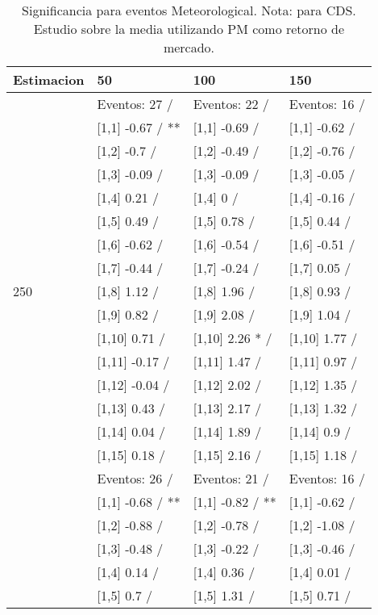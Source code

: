 \begin{table}

\caption{Significancia para eventos Meteorological. Nota: para CDS. Estudio sobre la media utilizando PM como retorno de mercado.}
\centering
\begin{tabular}[t]{llll}
\toprule
Estimacion & 50 & 100 & 150\\
\midrule
 & Eventos:  27 / & Eventos:  22 / & Eventos:  16 /\\
 & {}[1,1] -0.67  / ** & {}[1,1] -0.69  / & {}[1,1] -0.62  /\\
 & {}[1,2] -0.7  / & {}[1,2] -0.49  / & {}[1,2] -0.76  /\\
 & {}[1,3] -0.09  / & {}[1,3] -0.09  / & {}[1,3] -0.05  /\\
 & {}[1,4] 0.21  / & {}[1,4] 0  / & {}[1,4] -0.16  /\\
\addlinespace
 & {}[1,5] 0.49  / & {}[1,5] 0.78  / & {}[1,5] 0.44  /\\
 & {}[1,6] -0.62  / & {}[1,6] -0.54  / & {}[1,6] -0.51  /\\
 & {}[1,7] -0.44  / & {}[1,7] -0.24  / & {}[1,7] 0.05  /\\
250 & {}[1,8] 1.12  / & {}[1,8] 1.96  / & {}[1,8] 0.93  /\\
 & {}[1,9] 0.82  / & {}[1,9] 2.08  / & {}[1,9] 1.04  /\\
\addlinespace
 & {}[1,10] 0.71  / & {}[1,10] 2.26 * / & {}[1,10] 1.77  /\\
 & {}[1,11] -0.17  / & {}[1,11] 1.47  / & {}[1,11] 0.97  /\\
 & {}[1,12] -0.04  / & {}[1,12] 2.02  / & {}[1,12] 1.35  /\\
 & {}[1,13] 0.43  / & {}[1,13] 2.17  / & {}[1,13] 1.32  /\\
 & {}[1,14] 0.04  / & {}[1,14] 1.89  / & {}[1,14] 0.9  /\\
\addlinespace
 & {}[1,15] 0.18  / & {}[1,15] 2.16  / & {}[1,15] 1.18  /\\
 & Eventos:  26 / & Eventos:  21 / & Eventos:  16 /\\
 & {}[1,1] -0.68  / ** & {}[1,1] -0.82  / ** & {}[1,1] -0.62  /\\
 & {}[1,2] -0.88  / & {}[1,2] -0.78  / & {}[1,2] -1.08  /\\
 & {}[1,3] -0.48  / & {}[1,3] -0.22  / & {}[1,3] -0.46  /\\
\addlinespace
 & {}[1,4] 0.14  / & {}[1,4] 0.36  / & {}[1,4] 0.01  /\\
 & {}[1,5] 0.7  / & {}[1,5] 1.31  / & {}[1,5] 0.71  /\\

\end{tabular}
\end{table}
